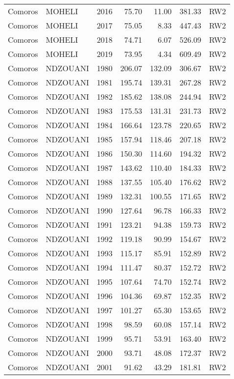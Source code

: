 \begin{longtable}{lllrrrl}
  Comoros & MOHELI & 2016 & 75.70 & 11.00 & 381.33 & RW2 \\ 
  Comoros & MOHELI & 2017 & 75.05 & 8.33 & 447.43 & RW2 \\ 
  Comoros & MOHELI & 2018 & 74.71 & 6.07 & 526.09 & RW2 \\ 
  Comoros & MOHELI & 2019 & 73.95 & 4.34 & 609.49 & RW2 \\ 
  Comoros & NDZOUANI & 1980 & 206.07 & 132.09 & 306.67 & RW2 \\ 
  Comoros & NDZOUANI & 1981 & 195.74 & 139.31 & 267.28 & RW2 \\ 
  Comoros & NDZOUANI & 1982 & 185.62 & 138.08 & 244.94 & RW2 \\ 
  Comoros & NDZOUANI & 1983 & 175.53 & 131.31 & 231.73 & RW2 \\ 
  Comoros & NDZOUANI & 1984 & 166.64 & 123.78 & 220.65 & RW2 \\ 
  Comoros & NDZOUANI & 1985 & 157.94 & 118.46 & 207.18 & RW2 \\ 
  Comoros & NDZOUANI & 1986 & 150.30 & 114.60 & 194.32 & RW2 \\ 
  Comoros & NDZOUANI & 1987 & 143.62 & 110.40 & 184.33 & RW2 \\ 
  Comoros & NDZOUANI & 1988 & 137.55 & 105.40 & 176.62 & RW2 \\ 
  Comoros & NDZOUANI & 1989 & 132.31 & 100.55 & 171.65 & RW2 \\ 
  Comoros & NDZOUANI & 1990 & 127.64 & 96.78 & 166.33 & RW2 \\ 
  Comoros & NDZOUANI & 1991 & 123.21 & 94.38 & 159.73 & RW2 \\ 
  Comoros & NDZOUANI & 1992 & 119.18 & 90.99 & 154.67 & RW2 \\ 
  Comoros & NDZOUANI & 1993 & 115.17 & 85.91 & 152.89 & RW2 \\ 
  Comoros & NDZOUANI & 1994 & 111.47 & 80.37 & 152.72 & RW2 \\ 
  Comoros & NDZOUANI & 1995 & 107.64 & 74.70 & 152.74 & RW2 \\ 
  Comoros & NDZOUANI & 1996 & 104.36 & 69.87 & 152.35 & RW2 \\ 
  Comoros & NDZOUANI & 1997 & 101.27 & 65.30 & 153.65 & RW2 \\ 
  Comoros & NDZOUANI & 1998 & 98.59 & 60.08 & 157.14 & RW2 \\ 
  Comoros & NDZOUANI & 1999 & 95.71 & 53.91 & 163.40 & RW2 \\ 
  Comoros & NDZOUANI & 2000 & 93.71 & 48.08 & 172.37 & RW2 \\ 
  Comoros & NDZOUANI & 2001 & 91.62 & 43.29 & 181.81 & RW2 \\ 

\end{longtable}

